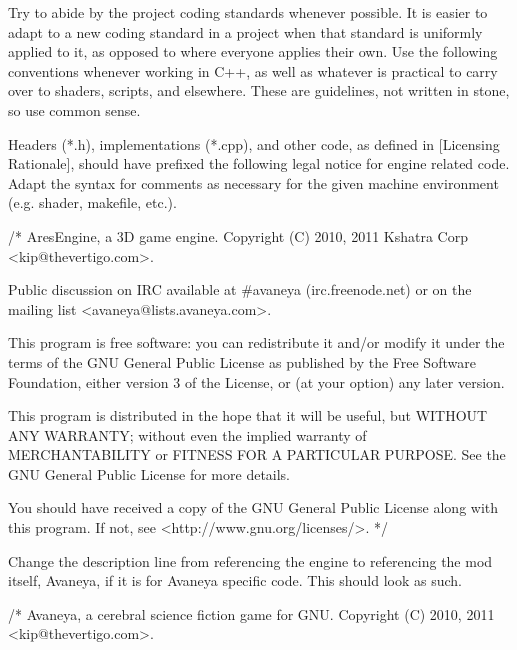 

Try to abide by the project coding standards whenever possible. It is easier to adapt to a new coding standard in a project when that standard is uniformly applied to it, as opposed to where everyone applies their own. Use the following conventions whenever working in C++, as well as whatever is practical to carry over to shaders, scripts, and elsewhere. These are guidelines, not written in stone, so use common sense.

Headers (*.h), implementations (*.cpp), and other code, as defined in [Licensing Rationale], should have prefixed the following legal notice for engine related code. Adapt the syntax for comments as necessary for the given machine environment (e.g. shader, makefile, etc.).

\startCodeExample
\starttyping
/*
    AresEngine, a 3D game engine.
    Copyright (C) 2010, 2011 Kshatra Corp <kip@thevertigo.com>.

    Public discussion on IRC available at #avaneya (irc.freenode.net)
    or on the mailing list <avaneya@lists.avaneya.com>.

    This program is free software: you can redistribute it and/or modify
    it under the terms of the GNU General Public License as published by
    the Free Software Foundation, either version 3 of the License, or
    (at your option) any later version.

    This program is distributed in the hope that it will be useful,
    but WITHOUT ANY WARRANTY; without even the implied warranty of
    MERCHANTABILITY or FITNESS FOR A PARTICULAR PURPOSE.  See the
    GNU General Public License for more details.

    You should have received a copy of the GNU General Public License
    along with this program.  If not, see <http://www.gnu.org/licenses/>.
*/
\stoptyping
\stopCodeExample

Change the description line from referencing the engine to referencing the mod itself, Avaneya, if it is for Avaneya specific code. This should look as such.

\startCodeExample
\starttyping
/*
    Avaneya, a cerebral science fiction game for GNU.
    Copyright (C) 2010, 2011 <kip@thevertigo.com>.

